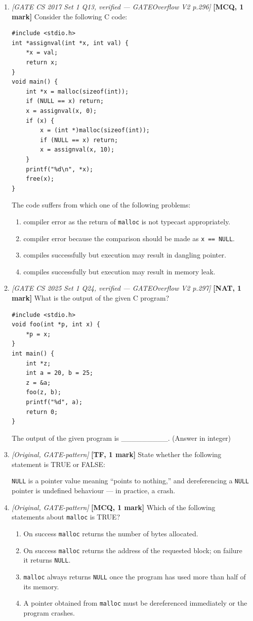 \documentclass[11pt]{article}
\begin{document}
\begin{enumerate}
\item[\textbf{Q7}] \textit{[GATE CS 2017 Set 1 Q13, verified --- GATEOverflow V2 p.296]} \textbf{[MCQ, 1 mark]} Consider the following C code:
\begin{verbatim}
#include <stdio.h>
int *assignval(int *x, int val) {
    *x = val;
    return x;
}
void main() {
    int *x = malloc(sizeof(int));
    if (NULL == x) return;
    x = assignval(x, 0);
    if (x) {
        x = (int *)malloc(sizeof(int));
        if (NULL == x) return;
        x = assignval(x, 10);
    }
    printf("%d\n", *x);
    free(x);
}
\end{verbatim}
The code suffers from which one of the following problems:
\begin{enumerate}
  \item[(A)] compiler error as the return of \texttt{malloc} is not typecast appropriately.
  \item[(B)] compiler error because the comparison should be made as \texttt{x == NULL}.
  \item[(C)] compiles successfully but execution may result in dangling pointer.
  \item[(D)] compiles successfully but execution may result in memory leak.
\end{enumerate}

\item[\textbf{Q8}] \textit{[GATE CS 2025 Set 1 Q24, verified --- GATEOverflow V2 p.297]} \textbf{[NAT, 1 mark]} What is the output of the given C program?
\begin{verbatim}
#include <stdio.h>
void foo(int *p, int x) {
    *p = x;
}
int main() {
    int *z;
    int a = 20, b = 25;
    z = &a;
    foo(z, b);
    printf("%d", a);
    return 0;
}
\end{verbatim}
The output of the given program is \_\_\_\_\_\_\_\_\_. (Answer in integer)

\item[\textbf{Q9}] \textit{[Original, GATE-pattern]} \textbf{[TF, 1 mark]} State whether the following statement is TRUE or FALSE:

\texttt{NULL} is a pointer value meaning ``points to nothing,'' and dereferencing a \texttt{NULL} pointer is undefined behaviour --- in practice, a crash.

\item[\textbf{Q10}] \textit{[Original, GATE-pattern]} \textbf{[MCQ, 1 mark]} Which of the following statements about \texttt{malloc} is TRUE?
\begin{enumerate}
  \item[(A)] On success \texttt{malloc} returns the number of bytes allocated.
  \item[(B)] On success \texttt{malloc} returns the address of the requested block; on failure it returns \texttt{NULL}.
  \item[(C)] \texttt{malloc} always returns \texttt{NULL} once the program has used more than half of its memory.
  \item[(D)] A pointer obtained from \texttt{malloc} must be dereferenced immediately or the program crashes.
\end{enumerate}


\end{enumerate}
\end{document}
